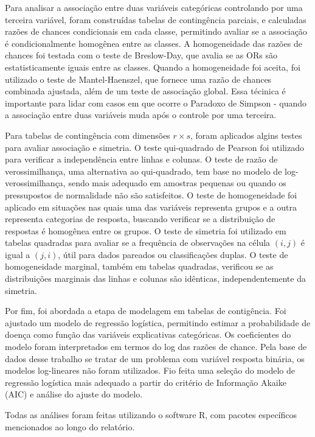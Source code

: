 \documentclass[
]{article}
\begin{document}
Para analisar a associação entre duas variáveis categóricas controlando
por uma terceira variável, foram construídas tabelas de contingência
parciais, e calculadas razões de chances condicionais em cada classe,
permitindo avaliar se a associação é condicionalmente homogênea entre as
classes. A homogeneidade das razões de chances foi testada com o teste
de Breslow-Day, que avalia se as ORs são estatisticamente iguais entre
as classes. Quando a homogeneidade foi aceita, foi utilizado o teste de
Mantel-Haenszel, que fornece uma razão de chances combinada ajustada,
além de um teste de associação global. Essa técinica é importante para
lidar com casos em que ocorre o Paradoxo de Simpson - quando a
associação entre duas variáveis muda após o controle por uma terceira.

Para tabelas de contingência com dimensões \(r×s\), foram aplicados
algins testes para avaliar associação e simetria. O teste qui-quadrado
de Pearson foi utilizado para verificar a independência entre linhas e
colunas. O teste de razão de verossimilhança, uma alternativa ao
qui-quadrado, tem base no modelo de log-verossimilhança, sendo mais
adequado em amostras pequenas ou quando os pressupostos de normalidade
não são satisfeitos. O teste de homogeneidade foi aplicado em situações
nas quais uma das variáveis representa grupos e a outra representa
categorias de resposta, buscando verificar se a distribuição de
respostas é homogênea entre os grupos. O teste de simetria foi utilizado
em tabelas quadradas para avaliar se a frequência de observações na
célula \((i,j)\) é igual a \((j, i)\), útil para dados pareados ou
classificações duplas. O teste de homogeneidade marginal, também em
tabelas quadradas, verificou se as distribuições marginais das linhas e
colunas são idênticas, independentemente da simetria.

Por fim, foi abordada a etapa de modelagem em tabelas de contigência.
Foi ajustado um modelo de regressão logística, permitindo estimar a
probabilidade de doença como função das variáveis explicativas
categóricas. Os coeficientes do modelo foram interpretados em termos do
log das razões de chance. Pela base de dados desse trabalho se tratar de
um problema com variável resposta binária, os modelos log-lineares não
foram utilizados. Fio feita uma seleção do modelo de regressão logística
mais adequado a partir do critério de Informação Akaike (AIC) e análise
do ajuste do modelo.

Todas as análises foram feitas utilizando o software R, com pacotes
específicos mencionados ao longo do relatório.
\end{document}

